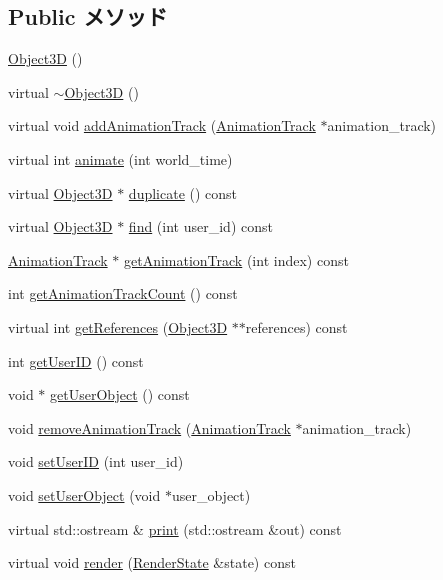 \subsection*{Public メソッド}
\begin{CompactItemize}
\item 
\hyperlink{classm3g_1_1Object3D_f4b10c33b9014a3f0a675ef4b699b773}{Object3D} ()
\item 
virtual \hyperlink{classm3g_1_1Object3D_8ece10725587e63a2c75283c16cc4df5}{$\sim$Object3D} ()
\item 
virtual void \hyperlink{classm3g_1_1Object3D_415c0b110f95410ded9b85e5d99a496b}{addAnimationTrack} (\hyperlink{classm3g_1_1AnimationTrack}{AnimationTrack} $\ast$animation\_\-track)
\item 
virtual int \hyperlink{classm3g_1_1Object3D_8aad1ceab4c2a03609c8a42324ce484d}{animate} (int world\_\-time)
\item 
virtual \hyperlink{classm3g_1_1Object3D}{Object3D} $\ast$ \hyperlink{classm3g_1_1Object3D_a25110dac934f867b83b73ad4741a0f4}{duplicate} () const 
\item 
virtual \hyperlink{classm3g_1_1Object3D}{Object3D} $\ast$ \hyperlink{classm3g_1_1Object3D_01924458161ea59220f2cc29339e2b00}{find} (int user\_\-id) const 
\item 
\hyperlink{classm3g_1_1AnimationTrack}{AnimationTrack} $\ast$ \hyperlink{classm3g_1_1Object3D_f0978f3f2efe3227ca613da3361424dd}{getAnimationTrack} (int index) const 
\item 
int \hyperlink{classm3g_1_1Object3D_0926843b66090795972850376b8e4e6c}{getAnimationTrackCount} () const 
\item 
virtual int \hyperlink{classm3g_1_1Object3D_d52d3c63076c4341b34c3631a17820e4}{getReferences} (\hyperlink{classm3g_1_1Object3D}{Object3D} $\ast$$\ast$references) const 
\item 
int \hyperlink{classm3g_1_1Object3D_b8d9067364251d0208fcdc502d394e2c}{getUserID} () const 
\item 
void $\ast$ \hyperlink{classm3g_1_1Object3D_a9b8541216c1fa7792617218a5fb6672}{getUserObject} () const 
\item 
void \hyperlink{classm3g_1_1Object3D_e36d8f8544daee6bd4e2ccd6755ed03d}{removeAnimationTrack} (\hyperlink{classm3g_1_1AnimationTrack}{AnimationTrack} $\ast$animation\_\-track)
\item 
void \hyperlink{classm3g_1_1Object3D_8eaa86665b4ca2c39691b6efc50108ee}{setUserID} (int user\_\-id)
\item 
void \hyperlink{classm3g_1_1Object3D_2285b0af7d6d293c4cf0e0d4559fd9b5}{setUserObject} (void $\ast$user\_\-object)
\item 
virtual std::ostream \& \hyperlink{classm3g_1_1Object3D_6fea17fa1532df3794f8cb39cb4f911f}{print} (std::ostream \&out) const 
\item 
virtual void \hyperlink{classm3g_1_1Object3D_8babc8a79b78615da51161e94029eea9}{render} (\hyperlink{structm3g_1_1RenderState}{RenderState} \&state) const 
\end{CompactItemize}


